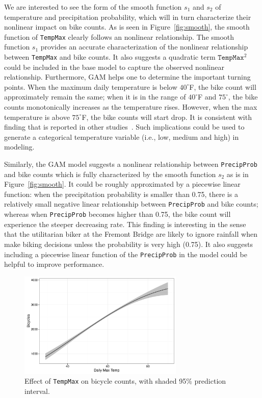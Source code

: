 \documentclass [11pt, proquest] {uwthesis}[2015/03/03]
\begin{document}
We are interested to see the form of the smooth function $s_1$ and $s_2$ of temperature and precipitation probability, which will in turn characterize their nonlinear impact on bike counts. As is seen in Figure~\ref{fig:smooth}, the smooth function of \texttt{TempMax} clearly follows an nonlinear relationship. The smooth function $s_1$ provides an accurate characterization of the nonlinear relationship between \texttt{TempMax} and bike counts. It also suggests a quadratic term $\texttt{TempMax}^2$ could be included in the base model to capture the observed nonlinear relationship. Furthermore, GAM helps one to determine the important turning points. When the maximum daily temperature is below $40^{\circ}$F, the bike count will approximately remain the same; when it is in the range of $40^{\circ}$F and $75^{\circ}$, the bike counts monotonically increases as the temperature rises. However, when the max temperature is above $75^{\circ}$F, the bike counts will start drop. It is consistent with finding that is reported in other studies~\cite{Rose07,Richardson00}. Such implications could be used to generate a categorical temperature variable (i.e., low, medium and high) in modeling.

Similarly, the GAM model suggests a nonlinear relationship between \texttt{PrecipProb} and bike counts which is fully characterized by the smooth function $s_2$ as is in Figure~\ref{fig:smooth}. It could be roughly approximated by a piecewise linear function: when the precipitation probability is smaller than 0.75, there is a relatively small negative linear relationship between \texttt{PrecipProb} and bike counts; whereas when \texttt{PrecipProb} becomes higher than 0.75, the bike count will experience the steeper decreasing rate. This finding is interesting in the sense that the utilitarian biker at the Fremont Bridge are likely to ignore rainfall when make biking decisions unless the probability is very high (0.75). It also suggests including a piecewise linear function of the \texttt{PrecipProb} in the model could be helpful to improve performance.

\begin{figure}
\centering
   \includegraphics[width=0.7\textwidth]{figures/sim/temperture} 
  \caption{Effect of \texttt{TempMax} on bicycle counts, with shaded 95\% prediction interval.}
  \label{fig:temp}
\end{figure}
\end{document}
